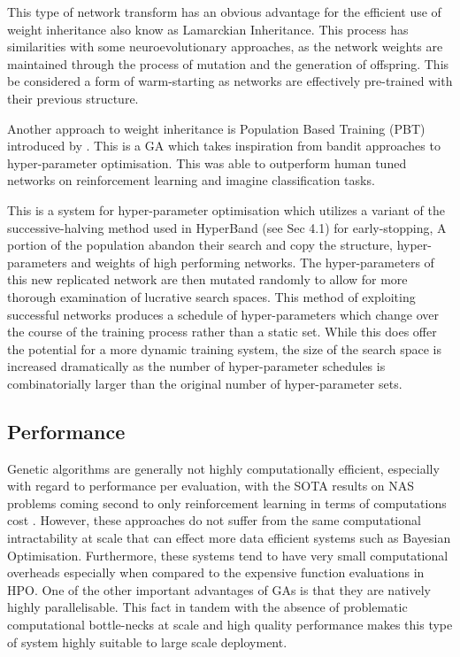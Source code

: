 \documentclass{article}
\begin{document}
		This type of network transform has an obvious advantage for the efficient use of weight inheritance also know as Lamarckian Inheritance. This process has similarities with some neuroevolutionary approaches, as the network weights are maintained through the process of mutation and the generation of offspring. This be considered a form of warm-starting as networks are effectively pre-trained with their previous structure.   

		Another approach to weight inheritance is Population Based Training (PBT) introduced by \cite{39}. This is a GA which takes inspiration from bandit approaches to hyper-parameter optimisation. This was able to outperform human tuned networks on reinforcement learning and imagine classification tasks.
		\par
		This is a system for hyper-parameter optimisation which utilizes a variant of the  successive-halving\cite{SH} method used in HyperBand (see Sec 4.1) for early-stopping, A portion of the population abandon their search and copy the structure, hyper-parameters and weights of high performing networks. The hyper-parameters of this new replicated network are then mutated randomly to allow for more thorough examination of lucrative search spaces. This method of exploiting successful networks produces a schedule of hyper-parameters which change over the course of the training process rather than a static set. While this does offer the potential for a more dynamic training system, the size of the search space is increased dramatically as the number of hyper-parameter schedules is combinatorially larger than the original number of hyper-parameter sets.


	\subsection{Performance}

	

	Genetic algorithms are generally not highly computationally efficient, especially with regard to performance per evaluation, with the SOTA results on NAS problems coming second to only reinforcement learning in terms of computations cost \cite{51} \cite{41} \cite{real2017}. However, these approaches do not suffer from the same computational intractability at scale that can effect more data efficient systems such as Bayesian Optimisation. Furthermore, these systems tend to have very small computational overheads especially when compared to the expensive function evaluations in HPO. One of the other important advantages of GAs is that they are natively highly parallelisable. This fact in tandem with the absence of problematic computational bottle-necks at scale and high quality performance makes this type of system highly suitable to large scale deployment.
\end{document}
